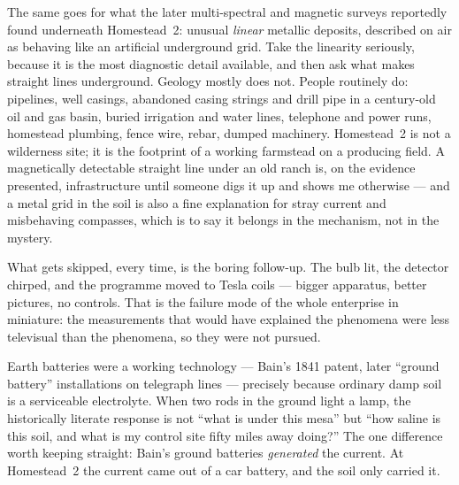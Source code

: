 The same goes for what the later multi-spectral and magnetic surveys reportedly found underneath
Homestead~2: unusual \emph{linear} metallic deposits, described on air as behaving like an
artificial underground grid. Take the linearity seriously, because it is the most diagnostic detail
available, and then ask what makes straight lines underground. Geology mostly does not. People
routinely do: pipelines, well casings, abandoned casing strings and drill pipe in a century-old oil
and gas basin, buried irrigation and water lines, telephone and power runs, homestead plumbing,
fence wire, rebar, dumped machinery. Homestead~2 is not a wilderness site; it is the footprint of a
working farmstead on a producing field. A magnetically detectable straight line under an old ranch
is, on the evidence presented, infrastructure until someone digs it up and shows me otherwise ---
and a metal grid in the soil is also a fine explanation for stray current and misbehaving compasses,
which is to say it belongs in the mechanism, not in the mystery.

What gets skipped, every time, is the boring follow-up. The bulb lit, the detector chirped, and the
programme moved to Tesla coils --- bigger apparatus, better pictures, no controls. That is the
failure mode of the whole enterprise in miniature: the measurements that would have explained the
phenomena were less televisual than the phenomena, so they were not pursued.

\begin{funfact}
 Earth batteries were a
working technology --- Bain's 1841 patent, later ``ground battery'' installations on telegraph
lines --- precisely because ordinary damp soil is a serviceable electrolyte. When two rods in the
ground light a lamp, the historically literate response is not ``what is under this mesa'' but
``how saline is this soil, and what is my control site fifty miles away doing?'' The one difference
worth keeping straight: Bain's ground batteries \emph{generated} the current. At Homestead~2 the
current came out of a car battery, and the soil only carried it.
\end{funfact}

